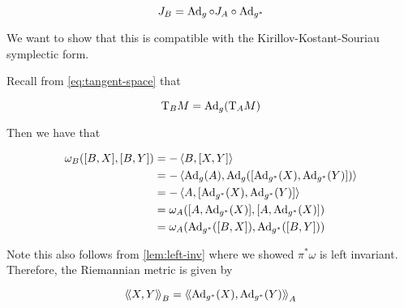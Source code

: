 \documentclass{article}
\DeclareMathOperator{\SU}{SU}
\newcommand{\su}{\mathfrak{su}}
\renewcommand{\tilde}{\widetilde}
\newcommand{\iinner}[1]{\left\langle\!\left\langle #1 \right\rangle\!\right\rangle}
\begin{document}
\[J_B = \operatorname{Ad}_g \circ J_A \circ \operatorname{Ad}_{g^*}\]

We want to show that this is compatible with the Kirillov-Kostant-Souriau symplectic form.

Recall from \cref{eq:tangent-space} that

\[\mathrm{T}_BM = \operatorname{Ad}_g(\mathrm{T}_A M)\]

Then we have that

\begin{align*}
    \omega_B([B, X], [B, Y]) &= -\left\langle B, [X, Y] \right\rangle \\
    &= -\left\langle \operatorname{Ad}_g(A), \operatorname{Ad}_g([\operatorname{Ad}_{g^*}(X), \operatorname{Ad}_{g^*}(Y)]) \right\rangle \\
    &= -\left\langle A, [\operatorname{Ad}_{g^*}(X), \operatorname{Ad}_{g^*}(Y)] \right\rangle \\
    &= \omega_A([A, \operatorname{Ad}_{g^*}(X)], [A, \operatorname{Ad}_{g^*}(X)]) \\
    &= \omega_A(\operatorname{Ad}_{g^*}([B, X]), \operatorname{Ad}_{g^*}([B, Y]))
\end{align*}

Note this also follows from \cref{lem:left-inv} where we showed \(\pi^*\omega\) is left invariant. Therefore, the Riemannian metric is given by

\[\iinner{X, Y}_B = \iinner{\Ad_{g^*}(X), \Ad_{g^*}(Y)}_A\]










\end{document}
